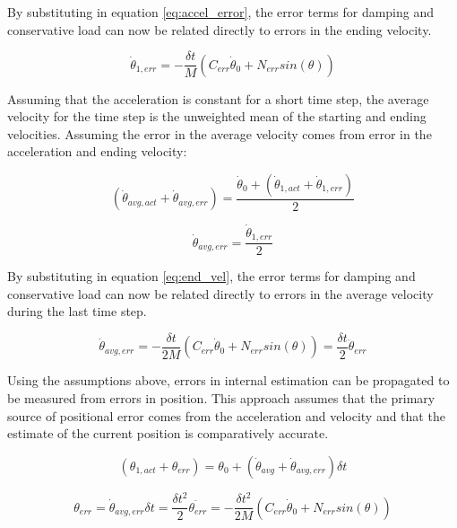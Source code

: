 By substituting in equation \ref{eq:accel_error}, the error terms for damping and conservative load can now be related directly to errors in the ending velocity.

\begin{equation} \label{eq:end_vel}
\dot{\theta}_{1, err} = - \dfrac{\delta t}{M} \left(C_{err} \dot{\theta}_{0} + N_{err} sin \left(\theta \right) \right)
\end{equation}

Assuming that the acceleration is constant for a short time step, the average velocity for the time step is the unweighted mean of the starting and ending velocities. Assuming the error in the average velocity comes from error in the acceleration and ending velocity:

\begin{equation}
\left(\dot{\theta}_{avg, act} + \dot{\theta}_{avg, err} \right) = \dfrac{\dot{\theta}_{0} + \left(\dot{\theta}_{1, act} + \dot{\theta}_{1, err} \right)}{2}
\end{equation}

\begin{equation}
\dot{\theta}_{avg, err} = \dfrac{\dot{\theta}_{1, err}}{2}
\end{equation}

By substituting in equation \ref{eq:end_vel}, the error terms for damping and conservative load can now be related directly to errors in the average velocity during the last time step.

\begin{equation}
\dot{\theta}_{avg, err} = - \dfrac{\delta t}{2M} \left(C_{err} \dot{\theta}_{0} + N_{err} sin \left(\theta \right) \right) = \dfrac{\delta t}{2} \ddot{\theta}_{err}
\end{equation}


Using the assumptions above, errors in internal estimation can be propagated to be measured from errors in position. This approach assumes that the primary source of positional error comes from the acceleration and velocity and that the estimate of the current position is comparatively accurate.

\begin{equation}
\left(\theta_{1, act} + \theta_{err} \right) = \theta_{0} + \left(\dot{\theta}_{avg} + \dot{\theta}_{avg, err} \right) \delta t
\end{equation}

\begin{equation}
\theta_{err} = \dot{\theta}_{avg, err} \delta t = \dfrac{\delta t^{2}}{2} \ddot{\theta_{err}} = - \dfrac{\delta t^{2}}{2M} \left(C_{err} \dot{\theta}_{0} + N_{err} sin \left(\theta \right) \right)
\end{equation}

